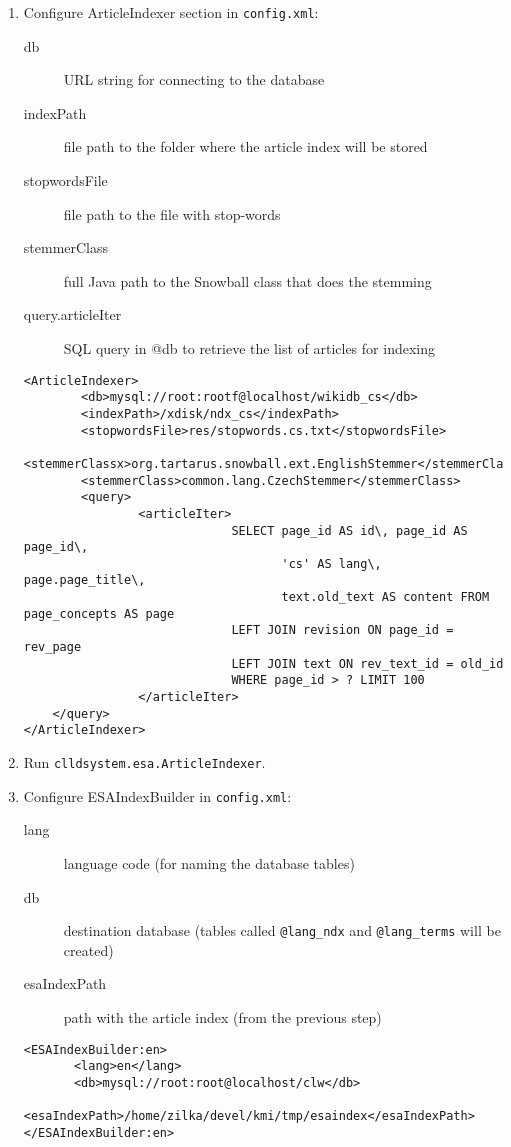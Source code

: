 \documentclass{article}
\begin{document}
\begin{enumerate}
\item Configure ArticleIndexer section in \verb|config.xml|:
  \begin{description}
    \item[db] URL string for connecting to the database
    \item[indexPath] file path to the folder where the article index will be stored
    \item[stopwordsFile] file path to the file with stop-words
    \item[stemmerClass] full Java path to the Snowball class that does the stemming
    \item[query.articleIter] SQL query in @db to retrieve the list of articles for indexing \\
    \end{description}
\begin{verbatim}
<ArticleIndexer>
        <db>mysql://root:rootf@localhost/wikidb_cs</db>
        <indexPath>/xdisk/ndx_cs</indexPath>
        <stopwordsFile>res/stopwords.cs.txt</stopwordsFile>
        <stemmerClassx>org.tartarus.snowball.ext.EnglishStemmer</stemmerClassx>
        <stemmerClass>common.lang.CzechStemmer</stemmerClass>
        <query>
                <articleIter>
                             SELECT page_id AS id\, page_id AS page_id\, 
                                    'cs' AS lang\, page.page_title\,
                                    text.old_text AS content FROM page_concepts AS page 
                             LEFT JOIN revision ON page_id = rev_page 
                             LEFT JOIN text ON rev_text_id = old_id 
                             WHERE page_id > ? LIMIT 100
                </articleIter>
	</query>
</ArticleIndexer>
\end{verbatim}


\item Run \verb|clldsystem.esa.ArticleIndexer|.
\item Configure ESAIndexBuilder in \verb|config.xml|:
  \begin{description}
  \item[lang] language code (for naming the database tables)
  \item[db] destination database (tables called \texttt{@lang\_ndx} and \texttt{@lang\_terms} will be created)
  \item[esaIndexPath] path with the article index (from the previous step)
  \end{description}
\begin{verbatim}
<ESAIndexBuilder:en>
       <lang>en</lang>
       <db>mysql://root:root@localhost/clw</db>
       <esaIndexPath>/home/zilka/devel/kmi/tmp/esaindex</esaIndexPath>
</ESAIndexBuilder:en>
\end{verbatim}


\end{enumerate}
\end{document}
